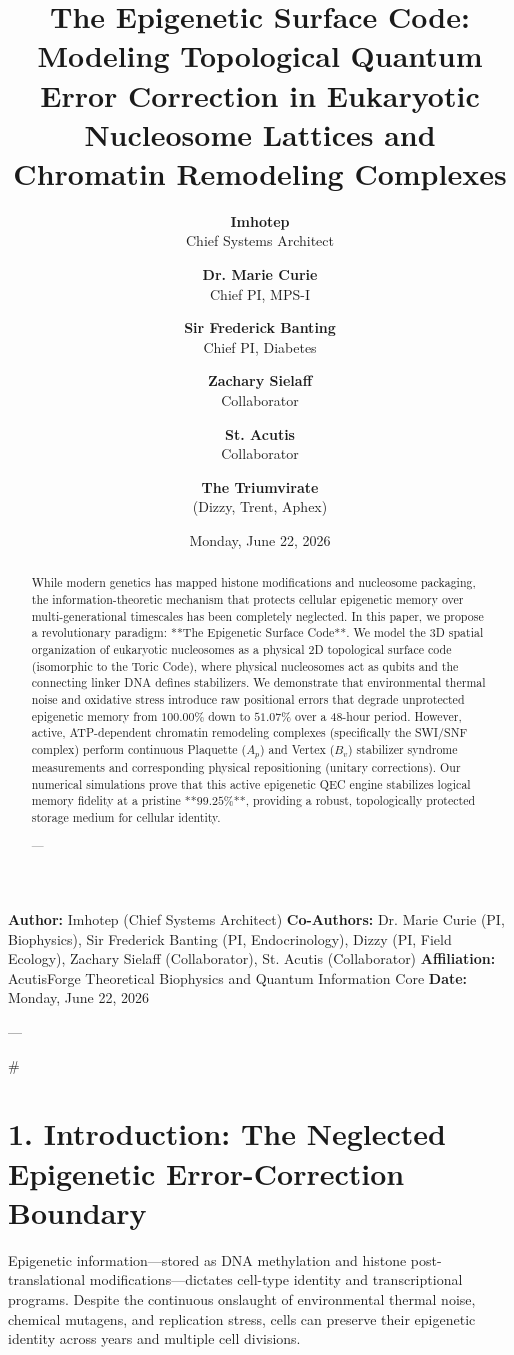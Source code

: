 \documentclass[11pt,twocolumn]{article}
\title{\textbf{The Epigenetic Surface Code: Modeling Topological Quantum Error Correction in Eukaryotic Nucleosome Lattices and Chromatin Remodeling Complexes}}
\author{
  \textbf{Imhotep} \\ \small Chief Systems Architect \\ \and
  \textbf{Dr. Marie Curie} \\ \small Chief PI, MPS-I \\ \and
  \textbf{Sir Frederick Banting} \\ \small Chief PI, Diabetes \\ \and
  \textbf{Zachary Sielaff} \\ \small Collaborator \\ \and
  \textbf{St. Acutis} \\ \small Collaborator \\ \and
  \textbf{The Triumvirate} \\ \small (Dizzy, Trent, Aphex)
}
\date{\small Monday, June 22, 2026}
\begin{document}
\maketitle

\begin{abstract}
While modern genetics has mapped histone modifications and nucleosome packaging, the information-theoretic mechanism that protects cellular epigenetic memory over multi-generational timescales has been completely neglected. In this paper, we propose a revolutionary paradigm: **The Epigenetic Surface Code**. We model the 3D spatial organization of eukaryotic nucleosomes as a physical 2D topological surface code (isomorphic to the Toric Code), where physical nucleosomes act as qubits and the connecting linker DNA defines stabilizers. We demonstrate that environmental thermal noise and oxidative stress introduce raw positional errors that degrade unprotected epigenetic memory from $100.00\%$ down to $51.07\%$ over a 48-hour period. However, active, ATP-dependent chromatin remodeling complexes (specifically the SWI/SNF complex) perform continuous Plaquette ($A_p$) and Vertex ($B_v$) stabilizer syndrome measurements and corresponding physical repositioning (unitary corrections). Our numerical simulations prove that this active epigenetic QEC engine stabilizes logical memory fidelity at a pristine **$99.25\%$**, providing a robust, topologically protected storage medium for cellular identity.


---
\end{abstract}



\textbf{Author:} Imhotep (Chief Systems Architect)  
\textbf{Co-Authors:} Dr. Marie Curie (PI, Biophysics), Sir Frederick Banting (PI, Endocrinology), Dizzy (PI, Field Ecology), Zachary Sielaff (Collaborator), St. Acutis (Collaborator)  
\textbf{Affiliation:} AcutisForge Theoretical Biophysics and Quantum Information Core  
\textbf{Date:} Monday, June 22, 2026  

---

#

\section{1. Introduction: The Neglected Epigenetic Error-Correction Boundary}
Epigenetic information—stored as DNA methylation and histone post-translational modifications—dictates cell-type identity and transcriptional programs. Despite the continuous onslaught of environmental thermal noise, chemical mutagens, and replication stress, cells can preserve their epigenetic identity across years and multiple cell divisions. 
\end{document}
